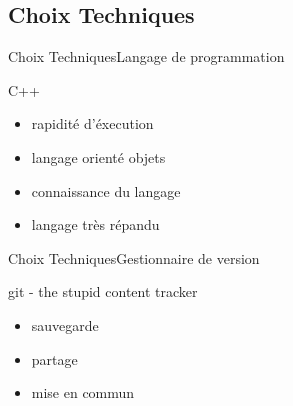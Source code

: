 \subsection{Choix Techniques}

\begin{frame}{Choix Techniques}{Langage de programmation}
	\begin{block}{C++}
  	\begin{itemize}
    	\item rapidité d'éxecution
    	\item langage orienté objets
    	\item connaissance du langage
    	\item langage très répandu
  	\end{itemize}
	\end{block}
\end{frame}

\begin{frame}{Choix Techniques}{Gestionnaire de version}
	\begin{block}{git - the stupid content tracker}
  	\begin{itemize}
    	\item sauvegarde
    	\item partage
    	\item mise en commun
  	\end{itemize}
	\end{block}
\end{frame}

